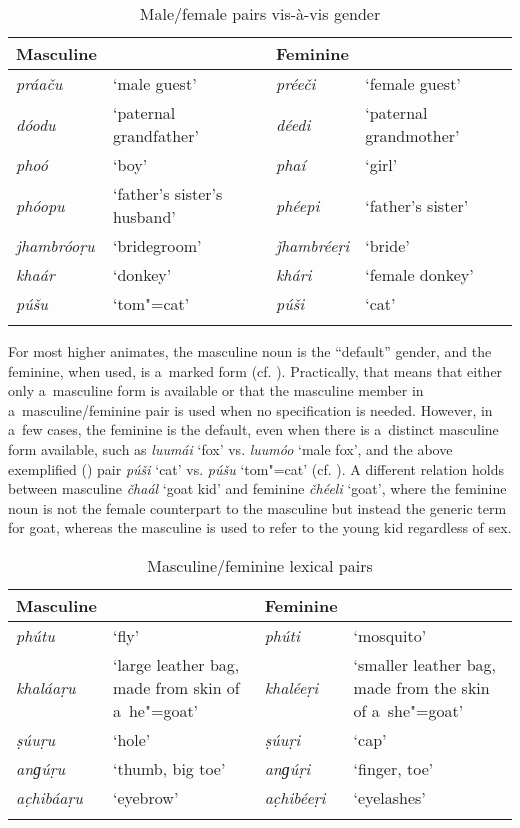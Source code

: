 \begin{table}[ht]
\caption{Male/female pairs vis-à-vis gender}
\begin{tabularx}{\textwidth}{ l Q l Q }
\lsptoprule
Masculine &
&
Feminine &
\\\hline
\textit{práaču} &
`male guest' &
\textit{préeči} &
`female guest'\\
\textit{dóodu} &
`paternal grandfather' &
\textit{déedi} &
`paternal grandmother'\\
\textit{phoó} &
`boy' &
\textit{phaí} &
`girl'\\
\textit{phóopu} &
`father's sister's husband' &
\textit{phéepi} &
`father's sister'\\
\textit{jhambróoṛu} &
`bridegroom' &
\textit{ǰhambréeṛi} &
`bride'\\
\textit{khaár} &
`donkey' &
\textit{khári} &
`female donkey'\\
\textit{púšu} &
`tom"=cat' &
\textit{púši} &
`cat'\\\lspbottomrule
\end{tabularx}
\label{tab:4-1}
\end{table}

For most higher animates, the masculine noun is the ``default'' gender, and the feminine, when used, is a~marked form (cf. ). Practically, that means that either only a~masculine form is available or that the masculine member in a~masculine/feminine pair is used when no specification is needed. However, in a~few cases, the feminine is the default, even when there is a~distinct masculine form available, such as \textit{luumái} `fox' vs. \textit{luumóo} `male fox', and the above exemplified () pair \textit{púši} `cat' vs. \textit{púšu} `tom"=cat' (cf. \citealt[103--104]{dahl2000}). A different relation holds between masculine \textit{čhaál} `goat kid' and feminine \textit{čhéeli} `goat', where the feminine noun is not the female counterpart to the masculine but instead the generic term for goat, whereas the masculine is used to refer to the young kid regardless of sex.


\begin{table}[ht]
\caption{Masculine/feminine lexical pairs}
\begin{tabularx}{\textwidth}{ l Q l Q }
\lsptoprule
Masculine &
&
Feminine &
\\\hline
\textit{phútu} &
`fly' &
\textit{phúti} &
`mosquito'\\
\textit{khaláaṛu}
&
`large leather bag, made from skin of a~he"=goat' &
\textit{khaléeṛi}
&
`smaller leather bag, made from the skin of a~she"=goat'\\
\textit{ṣúuṛu} &
`hole' &
\textit{ṣúuṛi} &
`cap'\\
\textit{anɡúṛu} &
`thumb, big toe' &
\textit{anɡúṛi} &
`finger, toe'\\
\textit{ac̣hibáaṛu} &
`eyebrow' &
\textit{ac̣hibéeṛi} &
`eyelashes'\\\lspbottomrule
\end{tabularx}
\label{tab:4-2}
\end{table}

